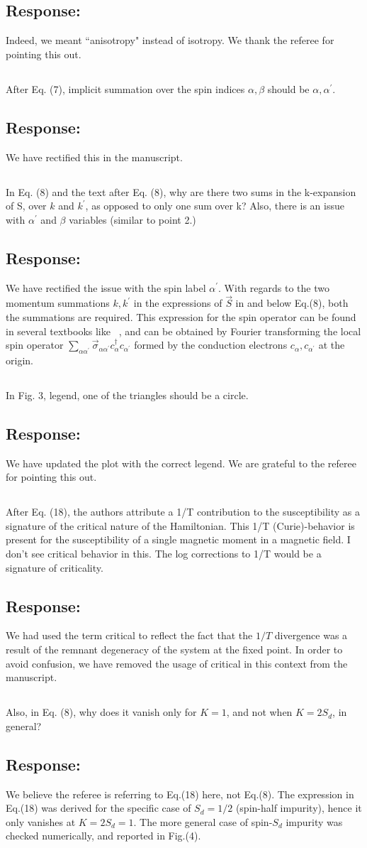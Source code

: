 \documentclass{article}
\newcommand{\response}[1]{{\color{blue}\subsection*{Response:}{#1}}}
\newcommand{\point}[1]{\subsection{}{#1}}
\begin{document}
\response{ Indeed, we meant ``anisotropy" instead of isotropy. We thank the referee for pointing this out.}

\point{ 
After Eq. (7), implicit summation over the spin indices $\alpha,\beta$ should be $\alpha,\alpha^\prime$.}

\response{ We have rectified this in the manuscript.}

\point{ 
In Eq. (8) and the text after Eq. (8), why are there two sums in the
k-expansion of S, over $k$ and $k^\prime$, as opposed to only one sum over k? Also, there is an issue with $\alpha^\prime$ and $\beta$ variables (similar to point 2.)}

\response{We have rectified the issue with the spin label \(\alpha^\prime\). With regards to the two momentum summations \(k,k^\prime\) in the expressions of \(\vec S\) in and below Eq.(8), both the summations are required. This expression for the spin operator can be found in several textbooks like ~\cite{coleman2015,hewson1993}, and can be obtained by Fourier transforming the local spin operator \(\sum_{\alpha\alpha^\prime}\vec \sigma_{\alpha\alpha^\prime}c^\dagger_{\alpha}c_{\alpha^\prime}\) formed by the conduction electrons \(c_{\alpha},c_{\alpha^\prime}\) at the origin.}

\point{
In Fig. 3, legend, one of the triangles should be a circle.}

\response{ We have updated the plot with the correct legend. We are grateful to the referee for pointing this out.}

\point{
After Eq. (18), the authors attribute a 1/T contribution to the
susceptibility as a signature of the critical nature of the Hamiltonian. This 1/T (Curie)-behavior is present for the susceptibility of a single magnetic moment in a magnetic field. I don't see critical behavior in this. The log corrections to 1/T would be a signature of criticality.}

\response{We had used the term critical to reflect the fact that the \(1/T\) divergence was a result of the remnant degeneracy of the system at the fixed point. In order to avoid confusion, we have removed the usage of critical in this context from the manuscript.}

\point{
Also, in Eq. (8), why does it vanish only for $K=1$, and not when $K=2S_{d}$, in general?}

\response{We believe the referee is referring to Eq.(18) here, not Eq.(8). The expression in Eq.(18) was derived for the specific case of $S_d = 1/2$ (spin-half impurity), hence it only vanishes at $K=2S_d=1$. The more general case of spin-\(S_d\) impurity was checked numerically, and reported in Fig.(4).}
\end{document}
